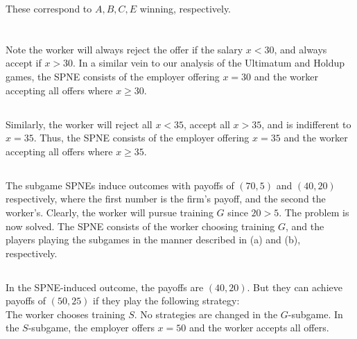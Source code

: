 \documentclass{article}
\begin{document}
These correspond to $A,B,C,E$ winning, respectively.

\section{}
\subsection{}
Note the worker will always reject the offer if the salary $x<30$, and always accept if $x>30$. In a similar vein to our analysis of the Ultimatum and Holdup games, the SPNE consists of the employer offering $x = 30$ and the worker accepting all offers where $x \geq 30$.
\subsection{}
Similarly, the worker will reject all $x < 35$, accept all $x>35$, and is indifferent to $x=35$. Thus, the SPNE consists of the employer offering $x = 35$ and the worker accepting all offers where $x \geq 35$.
\subsection{}
The subgame SPNEs induce outcomes with payoffs of $(70,5)$ and $(40,20)$ respectively, where the first number is the firm's payoff, and the second the worker's. Clearly, the worker will pursue training $G$ since $20>5$. The problem is now solved. The SPNE consists of the worker choosing training $G$, and the players playing the subgames in the manner described in (a) and (b), respectively.
\subsection{}
In the SPNE-induced outcome, the payoffs are $(40,20)$. But they can achieve payoffs of $(50,25)$ if they play the following strategy:\\
The worker chooses training $S$. No strategies are changed in the $G$-subgame. In the $S$-subgame, the employer offers $x=50$ and the worker accepts all offers.
\end{document}
